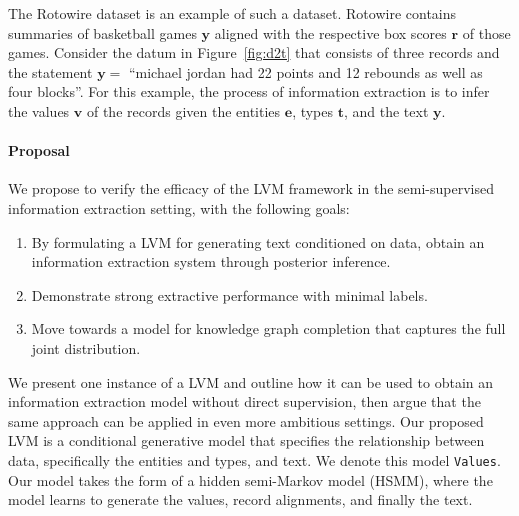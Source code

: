 \documentclass[12pt]{article}
\newcommand{\ba}{\mathbf{a}}
\newcommand{\be}{\mathbf{e}}
\newcommand{\br}{\mathbf{r}}
\newcommand{\bt}{\mathbf{t}}
\newcommand{\bv}{\mathbf{v}}
\newcommand{\by}{\mathbf{y}}
\begin{document}
The Rotowire dataset \citep{wiseman2017d2t} is an example of such a dataset.
Rotowire contains summaries of basketball games $\by$ aligned with the respective
box scores $\br$ of those games.
Consider the datum in Figure~\ref{fig:d2t} that consists of three records
and the statement $\by = $ ``michael jordan had 22 points and 12 rebounds as well as four blocks''.
For this example, the process of information extraction is to infer 
the values $\bv$ of the records given the entities $\be$, types $\bt$, and the text $\by$.

\paragraph{Proposal}
We propose to verify the efficacy of the LVM framework in the
semi-supervised information extraction setting,
with the following goals:
\begin{enumerate}
\item By formulating a LVM for generating text conditioned on data,
    obtain an information extraction system through posterior inference.
\item Demonstrate strong extractive performance with minimal labels.
\item Move towards a model for knowledge graph completion that captures
    the full joint distribution.
\end{enumerate}
We present one instance of a LVM and outline how it can be used to obtain
an information extraction model without direct supervision,
then argue that the same approach can be applied in even more ambitious settings.
Our proposed LVM is a conditional generative model that specifies
the relationship between data, specifically the entities and types, and text.
We denote this model \texttt{Values}.
Our model takes the form of a hidden semi-Markov model (HSMM),
where the model learns to generate the values, record alignments, and finally the text.
\end{document}
